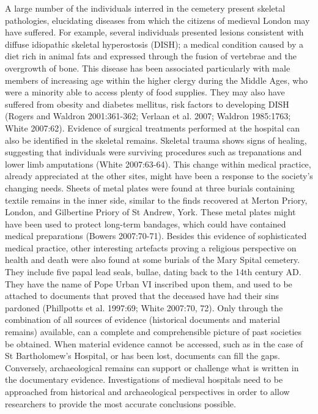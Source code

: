 \documentclass[%
	]{ijsra}
\begin{document}
A large number of the individuals interred in the cemetery present skeletal pathologies, elucidating diseases from which the citizens of medieval London may have suffered. For example, several individuals presented lesions consistent with diffuse idiopathic skeletal hyperostosis (DISH); a medical condition caused by a diet rich in animal fats and expressed through the fusion of vertebrae and the overgrowth of bone. This disease has been associated particularly with male members of increasing age within the higher clergy during the Middle Ages, who were a minority able to access plenty of food supplies. They may also have suffered from obesity and diabetes mellitus, risk factors to developing DISH (Rogers and Waldron 2001:361-362; Verlaan et al. 2007; Waldron 1985:1763; White 2007:62). Evidence of surgical treatments performed at the hospital can also be identified in the skeletal remains. Skeletal trauma shows signs of healing, suggesting that individuals were surviving procedures such as trepanations and lower limb amputations (White 2007:63-64). This change within medical practice, already appreciated at the other sites, might have been a response to the society’s changing needs.
Sheets of metal plates were found at three burials containing textile remains in the inner side, similar to the finds recovered at Merton Priory, London, and Gilbertine Priory of St Andrew, York. These metal plates might have been used to protect long-term bandages, which could have contained medical preparations (Bowers 2007:70-71). 
Besides this evidence of sophisticated medical practice, other interesting artefacts proving a religious perspective on health and death were also found at some burials of the Mary Spital cemetery. They include five papal lead seals, bullae, dating back to the 14th century AD. They have the name of Pope Urban VI inscribed upon them, and used to be attached to documents that proved that the deceased have had their sins pardoned (Phillpotts et al. 1997:69; White 2007:70, 72).
\IJSRAseparator
{}
Only through the combination of all sources of evidence (historical documents and material remains) available, can a complete and comprehensible picture of past societies be obtained. When material evidence cannot be accessed, such as in the case of St Bartholomew’s Hospital, or has been lost, documents can fill the gaps. Conversely, archaeological remains can support or challenge what is written in the documentary evidence. Investigations of medieval hospitals need to be approached from historical and archaeological perspectives in order to allow researchers to provide the most accurate conclusions possible. 
\end{document}
